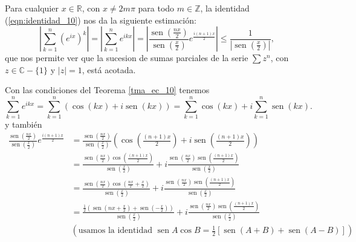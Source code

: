 \begin{remark}
  Para cualquier $x \in \mathbb{R}$, con $x \neq 2 m \pi$ para todo $m \in \mathbb{Z}$, la identidad (\ref{eqn:identidad_10}) nos da la siguiente estimación:
  $$
    \left|\sum_{k=1}^{n}\left(e^{i x}\right)^{k}\right|=\left|\sum_{k=1}^{n} e^{i k x}\right|=\left|\frac{\operatorname{sen}\left(\frac{n x}{2}\right)}{\operatorname{sen}\left(\frac{x}{2}\right)} e^{\frac{i(n+1) x}{2}}\right| \leq \frac{1}{\left|\operatorname{sen}\left(\frac{x}{2}\right)\right|},
  $$
  que nos permite ver que la sucesion de sumas parciales de la serie $\sum z^{n}$, con $z \in \mathbb{C}-\{1\}$ y $|z|=1$, está acotada.
\end{remark}
\begin{remark}
  Con las condiciones del Teorema \ref{tma_ec_10} tenemos
  $$
  \sum_{k=1}^{n} e^{i k x}=\sum_{k=1}^{n}(\cos (k x)+i \operatorname{sen}(k x))=\sum_{k=1}^{n} \cos (k x)+i \sum_{k=1}^{n} \operatorname{sen}(k x) \text {. }
  $$
  y también
  $$
  \begin{aligned}
  \frac{\operatorname{sen}\left(\frac{n x}{2}\right)}{\operatorname{sen}\left(\frac{x}{2}\right)} e^{\frac{i(n+1) x}{2}}&=\frac{\operatorname{sen}\left(\frac{n x}{2}\right)}{\operatorname{sen}\left(\frac{x}{2}\right)}\left(\cos \left(\frac{(n+1) x}{2}\right)+i \operatorname{sen}\left(\frac{(n+1) x}{2}\right)\right) \\[2ex]
  & =\frac{\operatorname{sen}\left(\frac{n x}{2}\right) \cos \left(\frac{(n+1) x}{2}\right)}{\operatorname{sen}\left(\frac{x}{2}\right)}+i \frac{\operatorname{sen}\left(\frac{n x}{2}\right) \operatorname{sen}\left(\frac{(n+1) x}{2}\right)}{\operatorname{sen}\left(\frac{x}{2}\right)}\\[2ex]
  & =\frac{\operatorname{sen}\left(\frac{n x}{2}\right) \cos \left(\frac{n x}{2}+\frac{x}{2}\right)}{\operatorname{sen}\left(\frac{x}{2}\right)}+i \frac{\operatorname{sen}\left(\frac{n x}{2}\right) \operatorname{sen}\left(\frac{(n+1) x}{2}\right)}{\operatorname{sen}\left(\frac{x}{2}\right)}\\[2ex]
  & =\frac{\frac{1}{2}\left(\operatorname{sen}\left(n x+\frac{x}{2}\right)+\operatorname{sen}\left(-\frac{x}{2}\right)\right)}{\operatorname{sen}\left(\frac{x}{2}\right)}+i \frac{\operatorname{sen}\left(\frac{n x}{2}\right) \operatorname{sen}\left(\frac{(n+1) x}{2}\right)}{\operatorname{sen}\left(\frac{x}{2}\right)}\\[2ex] 
  &(\text{usamos la identidad } \operatorname{sen} A \cos B=\frac{1}{2}\left[\operatorname{sen} (A+B)+\operatorname{sen} (A-B)\right])\\[2ex]

\end{aligned}$$
\end{remark}
